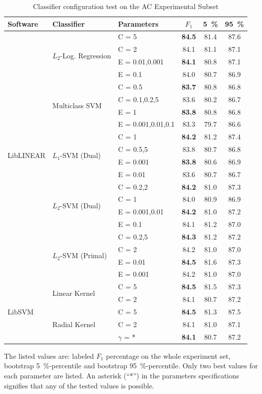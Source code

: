 \documentclass[12pt,notitlepage,a4paper]{report}
\begin{document}
\begin{table}[tb]
\caption{Classifier configuration test on the AC Experimental Subset}\label{tab:ac-classifiers}\footnotesize
\begin{center}
\shorthandoff{-}
\begin{tabular}{|l|l|l|c|c|c|}\hline
\bf Software & \bf Classifier & \bf Parameters & \bf $F_1$ & \bf 5~\% & \bf 95~\% \\\hline
\multirow{20}{*}{LibLINEAR} & \multirow{4}{*}{$L_2$-Log. Regression} & C = 5 & \bf 84.5 & 81.4 & 87.6 \\
 & & C = 2 & 84.1 & 81.1 & 87.1 \\\cline{3-6}
 & & E = 0.01,0.001 & \bf 84.1 & 80.8 & 87.1 \\
 & & E = 0.1 & 84.0 & 80.7 & 86.9 \\\cline{2-6}
 & \multirow{4}{*}{Multiclass SVM} & C = 0.5 & \bf 83.7 & 80.8 & 86.8 \\
 & & C = 0.1,0.2,5 & 83.6 & 80.2 & 86.7 \\\cline{3-6}
 & & E = 1 & \bf 83.8 & 80.8 & 86.8 \\
 & & E = 0.001,0.01,0.1 & 83.3 & 79.7 & 86.6 \\\cline{2-6}
 & \multirow{4}{*}{$L_1$-SVM (Dual)} & C = 1 & \bf 84.2 & 81.2 & 87.4 \\
 & & C = 0.5,5 & 83.8 & 80.7 & 86.8 \\\cline{3-6}
 & & E = 0.001 & \bf 83.8 & 80.6 & 86.9 \\
 & & E = 0.01 & 83.6 & 80.7 & 86.7 \\\cline{2-6}
 & \multirow{4}{*}{$L_2$-SVM (Dual)} & C = 0.2,2 & \bf 84.2 & 81.0 & 87.3 \\
 & & C = 1 & 84.0 & 80.9 & 86.9 \\\cline{3-6}
 & & E = 0.001,0.01 & \bf 84.2 & 81.0 & 87.2 \\
 & & E = 0.1 & 84.1 & 81.2 & 87.0 \\\cline{2-6}
 & \multirow{4}{*}{$L_2$-SVM (Primal)} & C = 0.2,5 & \bf 84.3 & 81.2 & 87.2 \\
 & & C = 2 & 84.2 & 81.0 & 87.0 \\\cline{3-6}
 & & E = 0.01 & \bf 84.5 & 81.6 & 87.3 \\
 & & E = 0.001 & 84.2 & 81.0 & 87.0 \\\hline
 \multirow{5}{*}{LibSVM} & \multirow{2}{*}{Linear Kernel} & C = 5 & \bf 84.5 & 81.5 & 87.3 \\
 & & C = 2 & 84.1 & 80.7 & 87.2 \\\cline{2-6}
 & \multirow{3}{*}{Radial Kernel} & C = 5 & \bf 84.5 & 81.3 & 87.5 \\
 & & C = 2 & 84.1 & 81.0 & 87.1 \\\cline{3-6}
 & & $\gamma$ = * & \bf 84.1 & 80.7 & 87.2 \\\hline
\end{tabular}
\shorthandon{-}
\end{center}
The listed values are: labeled $F_1$ percentage on the whole experiment set, bootstrap 5~\%-percentile and bootstrap 95~\%-percentile. Only two best values for each parameter are listed. An asterisk (``*'') in the parameters specifications signifies that any of the tested values is possible.
\end{table}
\end{document}
